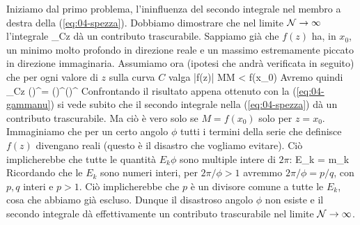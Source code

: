 Iniziamo dal primo problema, l'ininfluenza del secondo integrale nel membro a destra della (\ref{eq:04-spezza}). Dobbiamo dimostrare che nel limite ${\mathcal N}\to\infty$ l'integrale
\be
{}\int_C\de z
\ee
dà un contributo trascurabile. Sappiamo già che $f(z)$ ha, in $x_0$, un minimo molto profondo in direzione reale e un massimo estremamente piccato in direzione immaginaria. Assumiamo ora (ipotesi che andrà verificata in seguito) che per ogni valore di $z$ sulla curva $C$ valga
\be
|f(z)| \le M\quad M < f(x_0)
\ee
Avremo quindi
\be
{}\int_C\de z \le
{} \oint\de\theta \simeq
\left(\right)^\calN = \left(\right)^\calN\left(\right)^\calN
\ee
Confrontando il risultato appena ottenuto con la (\ref{eq:04-gammanu}) si vede subito che il secondo integrale nella (\ref{eq:04-spezza}) dà un contributo trascurabile. Ma ciò è vero solo se $M = f(x_0)$ solo per $z = x_0$. Immaginiamo che per un certo angolo $\phi$ tutti i termini della serie che definisce $f(z)$ divengano reali (questo è il disastro che vogliamo evitare). Ciò implicherebbe che tutte le quantità $E_k\phi$ sono multiple intere di $2\pi$:
\be
E_k = m_k\frac{2\pi}{\phi}
\ee
Ricordando che le $E_k$ sono numeri interi, per $2\pi/\phi > 1$ avremmo $2\pi/\phi = p/q$, con $p, q$ interi e $p > 1$. Ciò implicherebbe che $p$ è un divisore comune a tutte le $E_k$, cosa che abbiamo già escluso. Dunque il disastroso angolo $\phi$ non esiste e il secondo integrale dà effettivamente un contributo trascurabile nel limite ${\mathcal N}\to\infty$.

